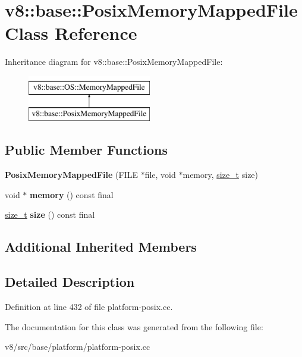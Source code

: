 \hypertarget{classv8_1_1base_1_1PosixMemoryMappedFile}{}\section{v8\+:\+:base\+:\+:Posix\+Memory\+Mapped\+File Class Reference}
\label{classv8_1_1base_1_1PosixMemoryMappedFile}
Inheritance diagram for v8\+:\+:base\+:\+:Posix\+Memory\+Mapped\+File\+:\begin{figure}[H]
\begin{center}
\leavevmode
\includegraphics[height=2.000000cm]{classv8_1_1base_1_1PosixMemoryMappedFile}
\end{center}
\end{figure}
\subsection*{Public Member Functions}
\begin{DoxyCompactItemize}
\item 
\mbox{\label{classv8_1_1base_1_1PosixMemoryMappedFile_aebe18d4ffe0c1ca03d0362bb07cf112e}} 
{\bfseries Posix\+Memory\+Mapped\+File} (F\+I\+LE $\ast$file, void $\ast$memory, \mbox{\hyperlink{classsize__t}{size\+\_\+t}} size)
\item 
\mbox{\label{classv8_1_1base_1_1PosixMemoryMappedFile_ac62dc9dc25920b2aa02a5ea6d974dab8}} 
void $\ast$ {\bfseries memory} () const final
\item 
\mbox{\label{classv8_1_1base_1_1PosixMemoryMappedFile_a04baf0cc74cf894496137318707b9e84}} 
\mbox{\hyperlink{classsize__t}{size\+\_\+t}} {\bfseries size} () const final
\end{DoxyCompactItemize}
\subsection*{Additional Inherited Members}


\subsection{Detailed Description}


Definition at line 432 of file platform-\/posix.\+cc.



The documentation for this class was generated from the following file\+:\begin{DoxyCompactItemize}
\item 
v8/src/base/platform/platform-\/posix.\+cc\end{DoxyCompactItemize}
